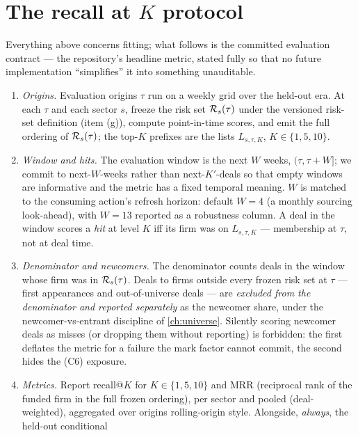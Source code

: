 \section{The recall at $K$ protocol}\label{ch10:sec:protocol}

Everything above concerns fitting; what follows is the committed
evaluation contract --- the repository's headline metric, stated fully so
that no future implementation ``simplifies'' it into something
unauditable.

\begin{protocol}\label{prot:ch10:recall}
\leavevmode
\begin{enumerate}[label=(\alph*)]
\item \emph{Origins.} Evaluation origins $\tau$ run on a weekly grid over
the held-out era. At each $\tau$ and each sector $s$, freeze the risk set
$\mathcal{R}_s(\tau)$ under the versioned risk-set definition (item (g)),
compute point-in-time scores, and emit the full ordering of
$\mathcal{R}_s(\tau)$; the top-$K$ prefixes are the lists $L_{s,\tau,K}$,
$K \in \{1, 5, 10\}$.
\item \emph{Window and hits.} The evaluation window is the next $W$
weeks, $(\tau, \tau + W]$; we commit to next-$W$-weeks rather than
next-$K'$-deals so that empty windows are informative and the metric has
a fixed temporal meaning. $W$ is matched to the consuming action's
refresh horizon: default $W = 4$ (a monthly sourcing look-ahead), with $W
= 13$ reported as a robustness column. A deal in the window scores a
\emph{hit} at level $K$ iff its firm was on $L_{s,\tau,K}$ --- membership
at $\tau$, not at deal time.
\item \emph{Denominator and newcomers.} The denominator counts deals in
the window whose firm was in $\mathcal{R}_s(\tau)$. Deals to firms outside
every frozen risk set at $\tau$ --- first appearances and out-of-universe
deals --- are \emph{excluded from the denominator and reported
separately} as the newcomer share, under the newcomer-vs-entrant
discipline of \cref{ch:universe}. Silently scoring newcomer deals as
misses (or dropping them without reporting) is forbidden: the first
deflates the metric for a failure the mark factor cannot commit, the
second hides the (C6) exposure.
\item \emph{Metrics.} Report recall@$K$ for $K \in \{1,5,10\}$ and MRR
(reciprocal rank of the funded firm in the full frozen ordering),
per sector and pooled (deal-weighted), aggregated over origins
rolling-origin style. Alongside, \emph{always}, the held-out conditional

\end{enumerate}
\end{protocol}
